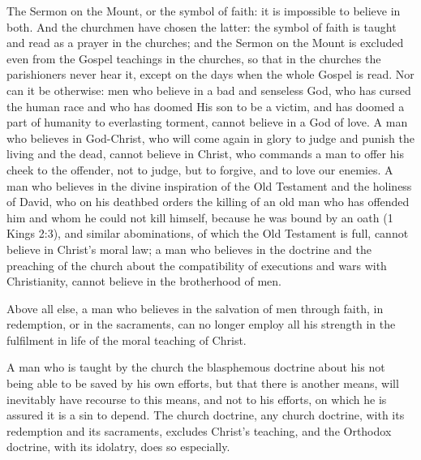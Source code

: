 \documentclass{book}
\begin{document}
The Sermon on the Mount, or the symbol of faith: it is impossible to believe in both. And the churchmen have chosen the latter: the symbol of faith is taught and read as a prayer in the churches; and the Sermon on the Mount is excluded even from the Gospel teachings in the churches, so that in the churches the parishioners never hear it, except on the days when the whole Gospel is read. Nor can it be otherwise: men who believe in a bad and senseless God, who has cursed the human race and who has doomed His son to be a victim, and has doomed a part of humanity to everlasting torment, cannot believe in a God of love. A man who believes in God-Christ, who will come again in glory to judge and punish the living and the dead, cannot believe in Christ, who commands a man to offer his cheek to the offender, not to judge, but to forgive, and to love our enemies. A man who believes in the divine inspiration of the Old Testament and the holiness of David, who on his deathbed orders the killing of an old man who has offended him and whom he could not kill himself, because he was bound by an oath (1 Kings 2:3), and similar abominations, of which the Old Testament is full, cannot believe in Christ’s moral law; a man who believes in the doctrine and the preaching of the church about the compatibility of executions and wars with Christianity, cannot believe in the brotherhood of men.

Above all else, a man who believes in the salvation of men through faith, in redemption, or in the sacraments, can no longer employ all his strength in the fulfilment in life of the moral teaching of Christ.

A man who is taught by the church the blasphemous doctrine about his not being able to be saved by his own efforts, but that there is another means, will inevitably have recourse to this means, and not to his efforts, on which he is assured it is a sin to depend. The church doctrine, any church doctrine, with its redemption and its sacraments, excludes Christ’s teaching, and the Orthodox doctrine, with its idolatry, does so especially.
\end{document}
